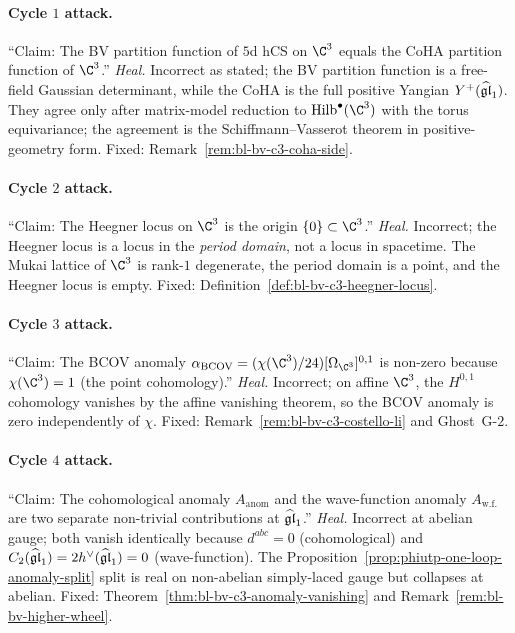 \paragraph{Cycle $1$ attack.} ``Claim: The BV partition function of
$5$d hCS on $\C^3$ equals the CoHA partition function of
$\C^3$.''
\emph{Heal.} Incorrect as stated; the BV partition function is a
free-field Gaussian determinant, while the CoHA is the full positive
Yangian $Y^+(\widehat{\mathfrak{gl}}_1)$. They agree only after matrix-model reduction
to $\Hilb^\bullet(\C^3)$ with the torus equivariance; the agreement is
the Schiffmann--Vasserot theorem in positive-geometry form. Fixed:
Remark~\ref{rem:bl-bv-c3-coha-side}.

\paragraph{Cycle $2$ attack.} ``Claim: The Heegner locus on $\C^3$ is
the origin $\{0\}\subset\C^3$.''
\emph{Heal.} Incorrect; the Heegner locus is a locus in the
\emph{period domain}, not a locus in spacetime. The Mukai lattice of
$\C^3$ is rank-$1$ degenerate, the period domain is a point, and the
Heegner locus is empty. Fixed:
Definition~\ref{def:bl-bv-c3-heegner-locus}.

\paragraph{Cycle $3$ attack.} ``Claim: The BCOV anomaly
$\alpha_{\mathrm{BCOV}} = (\chi(\C^3)/24)[\Omega_{\C^3}]^{0,1}$ is
non-zero because $\chi(\C^3) = 1$ (the point cohomology).''
\emph{Heal.} Incorrect; on affine $\C^3$, the $H^{0,1}$ cohomology
vanishes by the affine vanishing theorem, so the BCOV anomaly is
zero independently of $\chi$. Fixed:
Remark~\ref{rem:bl-bv-c3-costello-li} and Ghost~G-$2$.

\paragraph{Cycle $4$ attack.} ``Claim: The cohomological anomaly
$A_{\mathrm{anom}}$ and the wave-function anomaly $A_{\mathrm{w.f.}}$
are two separate non-trivial contributions at $\widehat{\mathfrak{gl}}_1$.''
\emph{Heal.} Incorrect at abelian gauge; both vanish identically
because $d^{abc} = 0$ (cohomological) and $C_2(\widehat{\mathfrak{gl}}_1) = 2h^\vee(\widehat{\mathfrak{gl}}_1)
= 0$ (wave-function). The Proposition~\ref{prop:phiutp-one-loop-anomaly-split}
split is real on non-abelian simply-laced gauge but collapses at
abelian. Fixed: Theorem~\ref{thm:bl-bv-c3-anomaly-vanishing}
and Remark~\ref{rem:bl-bv-higher-wheel}.


